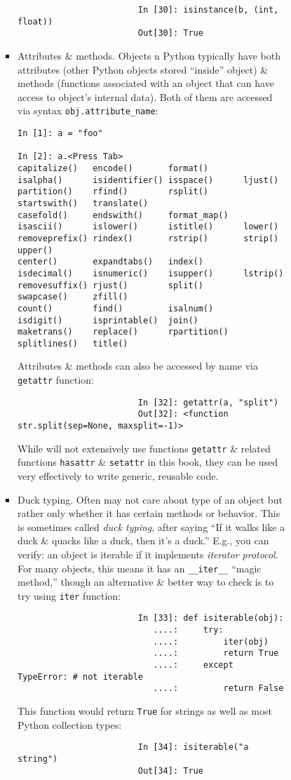 \documentclass{article}
\begin{document}
\begin{enumerate}
\begin{itemize}
\begin{itemize}
\begin{itemize}
\begin{itemize}
\begin{verbatim}
						In [30]: isinstance(b, (int, float))
						Out[30]: True
					\end{verbatim}
					\item {\sf Attributes \& methods.} Objects n Python typically have both attributes (other Python objects stored ``inside'' object) \& methods (functions associated with an object that can have access to object's internal data). Both of them are accessed via syntax \verb|obj.attribute_name|:
					\begin{verbatim}
In [1]: a = "foo"

In [2]: a.<Press Tab>
capitalize()   encode()       format()       isalpha()      isidentifier() isspace()      ljust()        partition()    rfind()        rsplit()       startswith()   translate()   
casefold()     endswith()     format_map()   isascii()      islower()      istitle()      lower()        removeprefix() rindex()       rstrip()       strip()        upper()       
center()       expandtabs()   index()        isdecimal()    isnumeric()    isupper()      lstrip()       removesuffix() rjust()        split()        swapcase()     zfill()       
count()        find()         isalnum()      isdigit()      isprintable()  join()         maketrans()    replace()      rpartition()   splitlines()   title()                      
					\end{verbatim}
					Attributes \& methods can also be accessed by name via {\tt getattr} function:
					\begin{verbatim}
						In [32]: getattr(a, "split")
						Out[32]: <function str.split(sep=None, maxsplit=-1)>
					\end{verbatim}
					While will not extensively use functions {\tt getattr} \& related functions {\tt hasattr} \& {\tt setattr} in this book, they can be used very effectively to write generic, reusable code.
					\item {\sf Duck typing.} Often may not care about type of an object but rather only whether it has certain methods or behavior. This is sometimes called {\it duck typing}, after saying ``If it walks like a duck \& quacks like a duck, then it's a duck.'' E.g., you can verify: an object is iterable if it implements {\it iterator protocol}. For many objects, this means it has an \verb|__iter__| ``magic method,'' though an alternative \& better way to check is to try using {\tt iter} function:
					\begin{verbatim}
						In [33]: def isiterable(obj):
						   ....:     try:
						   ....:         iter(obj)
						   ....:         return True
						   ....:     except TypeError: # not iterable
						   ....:         return False
					\end{verbatim}
					This function would return {\tt True} for strings as well as most Python collection types:
					\begin{verbatim}
						In [34]: isiterable("a string")
						Out[34]: True
						

\end{verbatim}
\end{itemize}
\end{itemize}
\end{itemize}
\end{itemize}
\end{enumerate}
\end{document}
